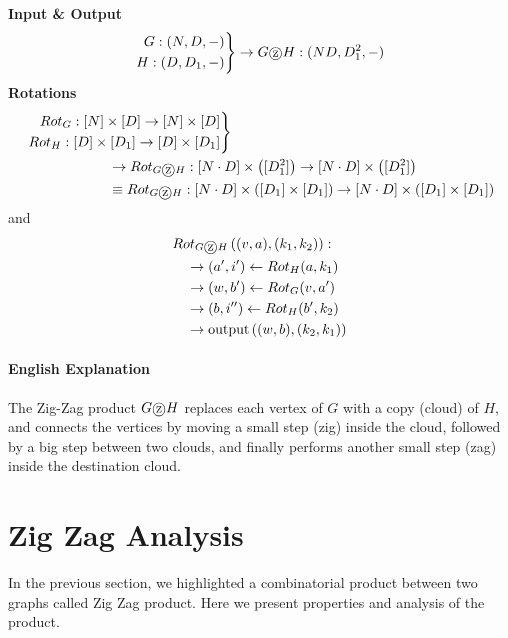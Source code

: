\documentclass[11pt, letter]{book}
\newcommand*\tcircle[1]{%
  \raisebox{-0.5pt}{%
    \textcircled{#1}%
  }%
}
\begin{document}
\begin{definition}
	\label{def:zig zag product}
	\textbf{Input \& Output}
	\begin{equation}
		\left. \begin{aligned}
 			G: (N, D, -) \\
 			H: (D, D_1, -) 
 		\end{aligned}\right\rbrace \rightarrow G \tcircle{z} H : (ND, D_1^2, -)
	\end{equation}
	\textbf{Rotations}
	\begin{align}
		&\left. \begin{aligned}
 			Rot_G: [N] \times [D] \rightarrow [N] \times [D] \\
 			Rot_H: [D] \times [D_1] \rightarrow [D] \times [D_1]
 		\end{aligned}\right \rbrace 
 		\\
 		&\quad \quad \quad \quad \quad \quad
 		\rightarrow Rot_{G\tcircle{z} H}: [N\cdot D] \times \left( [D_1^2] \right) \rightarrow [N\cdot D] \times \left( [D_1^2] \right)
 		\\
 		&\quad \quad \quad \quad \quad \quad
 		\equiv Rot_{G\tcircle{z} H}: [N\cdot D] \times \left( [D_1] \times [D_1] \right) \rightarrow [N\cdot D] \times \left( [D_1] \times [D_1] \right)
	\end{align}
	and 
	\begin{align}
		&Rot_{G \tcircle {z}  H} \left ( (v, a) , (k_1, k_2) \right) : \\
		&\quad \rightarrow (a', i') \gets Rot_H(a, k_1) \\
		&\quad \rightarrow (w, b') \gets Rot_G (v, a') \\
		&\quad \rightarrow (b, i'') \gets Rot_H (b', k_2) \\
		&\quad \rightarrow \text{output} \left( (w, b), (k_2, k_1) \right)
	\end{align}
	\paragraph{English Explanation} The Zig-Zag product $G \tcircle{z} H$ replaces each vertex of $G$ with a copy (cloud) of $H$, and connects the vertices by moving a small step (zig) inside the cloud, followed by a big step between two clouds, and finally performs another small step (zag) inside the destination cloud. 
\end{definition}

\section{Zig Zag Analysis}
In the previous section, we highlighted a combinatorial product between two graphs called Zig Zag product. Here we present properties and analysis of the product. 
\end{document}
